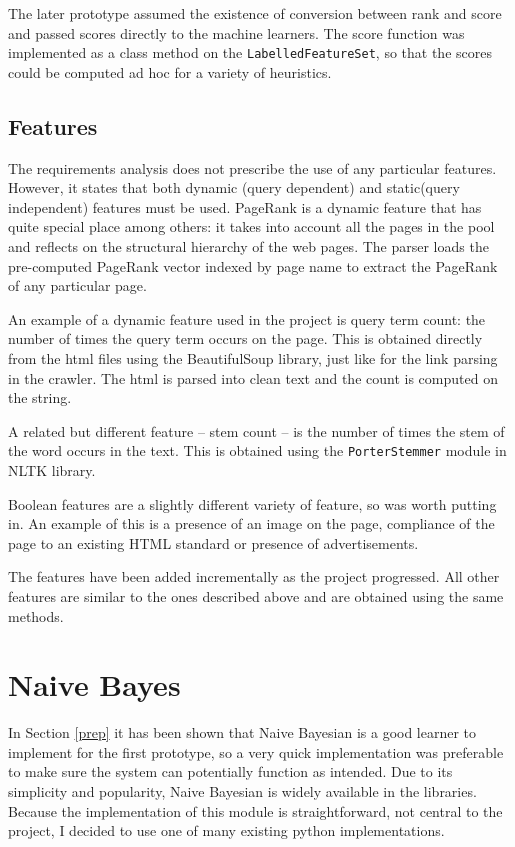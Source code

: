 \documentclass[12pt,notitlepage,twoside]{scrreprt}
\begin{document}
The later prototype assumed the existence of conversion between rank and score and passed
scores directly to the machine learners. The score function was implemented as a class method on the
\texttt{LabelledFeatureSet}, so that the scores could be computed ad hoc for a variety of
heuristics.

\subsection{Features}


The requirements analysis does not prescribe the use of any particular
features. However, it states that both dynamic (query dependent) and
static(query independent) features must be used. PageRank is a dynamic feature
that has quite special place among others: it takes into account all the pages
in the pool and reflects on the structural hierarchy of the web pages. 
The parser loads the pre-computed PageRank vector indexed by page name to
extract the PageRank of any particular page.

An example of a dynamic feature used in the project is query term count: the
number of times the query term occurs on the page. This is obtained directly
from the html files using the BeautifulSoup library, just like for the link
parsing in the crawler. The html is parsed into clean text and the count is
computed on the string.

A related but different feature -- stem count -- is the number of times the
stem of the word occurs in the text. This is obtained using the \texttt{PorterStemmer}
module in NLTK library.

Boolean features are a slightly different variety of feature, so was worth
putting in. An example of this is a presence of an image on the page, compliance of the
page to an existing HTML standard or presence of advertisements.

The features have been added incrementally as the project progressed. All other
features are similar to the ones described above and are obtained using the
same methods. 


\section{Naive Bayes}
In Section \ref{prep} it has been shown that Naive Bayesian is a good learner
to implement for the first prototype, so a very quick implementation was
preferable to make sure the system can potentially function as intended. Due to
its simplicity and popularity, Naive Bayesian is widely available in the
libraries. Because the implementation of this module is straightforward, not
central to the project, I decided to use one of many existing python
implementations. 
\end{document}
